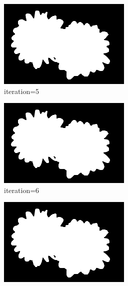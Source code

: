\documentclass{article}
\begin{document}
\begin{figure}[t]
\begin{subfigure}[t]{0.19\textwidth}
\includegraphics[width=\textwidth]{./images/marginals_iter_5.png}
\vspace{-0.6cm}
\caption{iteration=5}
\end{subfigure}
\begin{subfigure}[t]{0.19\textwidth}
\centering
\includegraphics[width=\textwidth]{./images/marginals_iter_6.png}
\vspace{-0.6cm}
\caption{iteration=6}
\end{subfigure}
\begin{subfigure}[t]{0.19\textwidth}
\centering
\includegraphics[width=\textwidth]{./images/marginals_iter_7.png}

\end{subfigure}
\end{figure}
\end{document}
